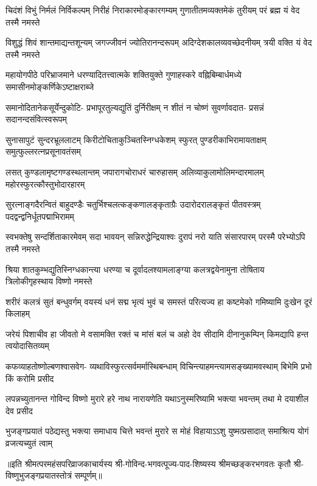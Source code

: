 
\begin{AutoCols}[\maxColumns]
\fourlineindentedshloka
{चिदंशं विभुं निर्मलं निर्विकल्पम्‌}
{निरीहं निराकारमोङ्कारगम्यम्‌}
{गुणातीतमव्यक्तमेकं तुरीयम्‌}
{परं ब्रह्म यं वेद तस्मै नमस्ते}%

\fourlineindentedshloka
{विशुद्धं शिवं शान्तमाद्यन्तशून्यम्‌}
{जगज्जीवनं ज्योतिरानन्दरूपम्‌}
{अदिग्देशकालव्यवच्छेदनीयम्‌} 
{त्रयी वक्ति यं वेद तस्मै नमस्ते}%

\fourlineindentedshloka
{महायोगपीठे परिभ्राजमाने} 
{धरण्यादितत्त्वात्मके शक्तियुक्ते}
{गुणाहस्करे वह्निबिम्बार्धमध्ये} 
{समासीनमोङ्कर्णिकेऽष्टाक्षराब्जे}%

\fourlineindentedshloka
{समानोदितानेकसूर्येन्दुकोटि-}
{प्रभापूरतुल्यद्युतिं दुर्निरीक्षम्‌}
{न शीतं न चोष्णं सुवर्णावदात-}
{प्रसन्नं सदानन्दसंवित्स्वरूपम्‌}%

\fourlineindentedshloka
{सुनासापुटं सुन्दरभ्रूललाटम्‌}
{किरीटोचिताकुञ्चितस्निग्धकेशम्‌}
{स्फुरत् पुण्डरीकाभिरामायताक्षम्‌}
{समुत्फुल्लरत्नप्रसूनावतंसम्‌}%

\fourlineindentedshloka
{लसत् कुण्डलामृष्टगण्डस्थलान्तम्‌}
{जपारागचोराधरं चारुहासम्‌}
{अलिव्याकुलामोलिमन्दारमालम्‌}
{महोरस्फुरत्कौस्तुभोदारहारम्‌}%

\fourlineindentedshloka
{सुरत्नाङ्गदैरन्वितं बाहुदण्डैः}
{चतुर्भिश्चलत्कङ्कणालङ्कृताग्रैः}
{उदारोदरालङ्कृतं पीतवस्त्रम्‌}
{पदद्वन्द्वनिर्धूतपद्माभिरामम्‌}%

\fourlineindentedshloka
{स्वभक्तेषु सन्दर्शिताकारमेवम्‌}
{सदा भावयन् सन्निरुद्धेन्द्रियाश्वः}
{दुरापं नरो याति संसारपारम्‌}
{परस्मै परेभ्योऽपि तस्मै नमस्ते}%

\fourlineindentedshloka
{श्रिया शातकुम्भद्युतिस्निग्धकान्त्या}
{धरण्या च दूर्वादलश्यामलाङ्ग्या}
{कलत्रद्वयेनामुना तोषिताय} 
{त्रिलोकीगृहस्थाय विष्णो नमस्ते}%

\fourlineindentedshloka
{शरीरं कलत्रं सुतं बन्धुवर्गम्‌}
{वयस्यं धनं सद्म भृत्यं भुवं च}
{समस्तं परित्यज्य हा कष्टमेको} 
{गमिष्यामि दुःखेन दूरं किलाहम्‌}%

\fourlineindentedshloka
{जरेयं पिशाचीव हा जीवतो मे}
{वसामक्ति रक्तं च मांसं बलं च}
{अहो देव सीदामि दीनानुकम्पिन्}
{किमद्यापि हन्त त्वयोदासितव्यम्‌}%

\fourlineindentedshloka
{कफव्याहतोष्णोल्बणश्वासवेग-}
{व्यथाविस्फुरत्सर्वमर्मास्थिबन्धाम्‌}
{विचिन्त्याहमन्त्यामसङ्ख्यामवस्थाम्}
{बिभेमि प्रभो किं करोमि प्रसीद}%

\fourlineindentedshloka
{लपन्नच्युतानन्त गोविन्द विष्णो}
{मुरारे हरे नाथ नारायणेति}
{यथाऽनुस्मरिष्यामि भक्त्या भवन्तम्‌}
{तथा मे दयाशील देव प्रसीद}%

\fourlineindentedshloka
{भुजङ्गप्रयातं पठेद्यस्तु भक्त्या}
{समाधाय चित्ते भवन्तं मुरारे}
{स मोहं विहायाऽऽशु युष्मत्प्रसादात्}
{समाश्रित्य योगं व्रजत्यच्युतं त्वाम्‌}%
\end{AutoCols}

॥इति श्रीमत्परमहंसपरिव्राजकाचार्यस्य श्री-गोविन्द-भगवत्पूज्य-पाद-शिष्यस्य 
श्रीमच्छङ्करभगवतः कृतौ श्री-विष्णुभुजङ्गप्रयातस्तोत्रं सम्पूर्णम्‌॥ 

